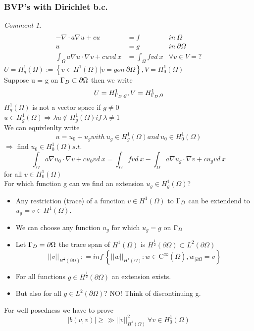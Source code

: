 \documentclass[english]{article}
\theoremstyle{definition}
\theoremstyle{remark}
\newtheorem*{comm}{Comment}
\newcommand{\f}[2]{\frac{#1}{#2}}							%
\newcommand{\p}{\partial}
\newcommand{\lam}{\lambda}			%
\newcommand{\OO}{\Omega}
\newcommand{\cinf}{\tx{C}^\infty}
\newcommand{\drw}{\Rightarrow}			%
\newcommand{\tri}{\nabla}
\newcommand{\tx}[1]{\text{#1}}
\begin{document}
\subsubsection{BVP's with Dirichlet b.c.}
\begin{comm}
  \begin{align*} \\
    -\nabla \cdot a \nabla u + cu &=f & in\ \OO\\
    u &=g & in\ \p\OO\\
    \int_\OO a \nabla u \cdot \nabla v + cuv d\ x &= \int_\OO fv d\ x & \forall v \in V = ?
  \end{align*}
  $U = H^1 _g (\OO) := \left\{v \in H^1 (\OO) | v = g on\ \p\OO \right\}, V= H^1 _0(\OO)$\\
  Suppose u = g on $\GG_D \subset \p \OO$ then we write $$U= H^1 _{\Gamma_D,g}, V= H^1_{\Gamma_D, 0}$$
  $H^1 _g(\OO)$ is not a vector space if $g \neq 0$\\
  $u\in H^1 _g(\OO)  \drw \lam u \notin H^1 _g(\OO) if\ \lam \neq 1$\\
  We can equivlenlty write $$u = u_0 + u _g with\ u_g \in H^1_g(\OO) and\ u_0 \in H^1 _0 (\OO)$$
  $\drw$ find $u_0 \in H^1 _0 (\OO) s.t.\ $ 
  $$\int_\OO a \tri u_0 \cdot \tri v + c u_0v d\ x = \int_{\OO}f v d\ x - \int_\OO a \tri u_g \cdot \tri v + c u_g v d\ x$$
  for all $v \in H^1 _0(\OO)$\\
  For which function g can we find an extension $u_g \in H^1_g (\OO)$?\\
  \begin{itemize}
  \item Any restriction (trace) of a function $v\in H^1(\OO)$ to $\Gamma_D$ can be extendend to $u_g=v \in H^1(\OO)$.\\
  \item We can choose any function $u_g$ for which $u_g = g$ on $\Gamma_D$\\
  \item Let $\GG_D = \p\OO$ the trace span of $H^1(\OO)$ is $H^{\f{1}{2}}(\p\OO) \subset L^2(\p \OO)$
    $$||v||_{H^{\f{1}{2}}(\p\OO)} : = inf\ \left\{||w||_{H^1(\OO)} : w \in \cinf (\bar\OO) , w_{|\p\OO} = v\right\}$$
  \item For all functions $g \in H^{\f{1}{2}}(\p\OO)$ an extension exists.
  \item But also for all $g\in L^2 (\p \OO)$? NO! Think of discontinuing g.
  \end{itemize}
\end{comm}
For well posedness we have to prove 
$$|b(v,v)|\geq \gg ||v||^2 _{H^1(\OO)} \ \forall v \in H^1 _0 (\OO)$$
\end{document}
